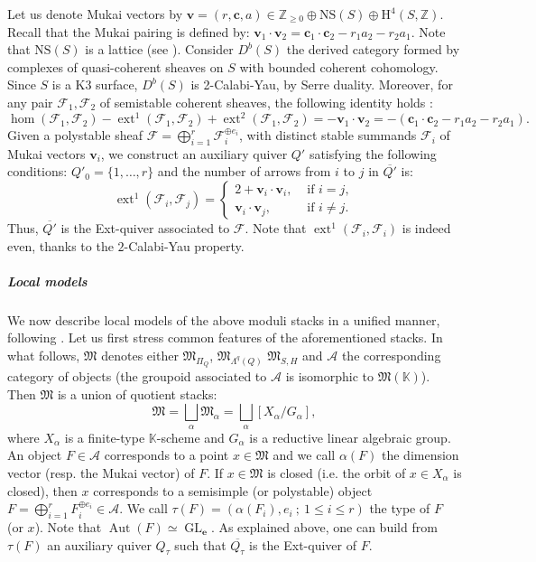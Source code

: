 \documentclass[11pt,english]{article}
\numberwithin{equation}{section}
\numberwithin{figure}{section}
\theoremstyle{definition}
\theoremstyle{plain}
\theoremstyle{remark}
\DeclareMathOperator{\Aut}{Aut}
\DeclareMathOperator{\ext}{ext}
\DeclareMathOperator{\GL}{GL}
\newcommand\ee{\mathbf{e}}
\newcommand\KK{\mathbb{K}}
\begin{document}
Let us denote Mukai vectors by $\textbf{v}=(r,\textbf{c},a)\in\mathbb{Z}_{\geq0}\oplus\mathrm{NS}(S)\oplus\mathrm{H}^{4}(S,\mathbb{Z})$.
Recall that the Mukai pairing is defined by: $\textbf{v}_{1}\cdot\textbf{v}_{2}=\textbf{c}_{1}\cdot\textbf{c}_{2}-r_{1}a_{2}-r_{2}a_{1}$.
Note that $\mathrm{NS}(S)$ is a lattice (see \cite[Ch. 1.]{Huy16}).
Consider $D^{b}(S)$ the derived category formed by complexes of quasi-coherent
sheaves on $S$ with bounded coherent cohomology. Since $S$ is a
K3 surface, $D^{b}(S)$ is 2-Calabi-Yau, by Serre duality. Moreover,
for any pair $\mathcal{F}_{1},\mathcal{F}_{2}$ of semistable coherent
sheaves, the following identity holds \cite[Cor. 6.1.5.]{HL10}:\[
\hom(\mathcal{F}_{1},\mathcal{F}_{2})-\ext^1(\mathcal{F}_{1},\mathcal{F}_{2})+\ext^2(\mathcal{F}_{1},\mathcal{F}_{2})=-\textbf{v}_{1}\cdot\textbf{v}_{2}=-(\textbf{c}_{1}\cdot\textbf{c}_{2}-r_{1}a_{2}-r_{2}a_{1}).
\]Given a polystable sheaf $\mathcal{F}=\bigoplus_{i=1}^{r}\mathcal{F}_{i}^{\oplus e_{i}}$,
with distinct stable summands $\mathcal{F}_{i}$ of Mukai vectors
$\textbf{v}_{i}$, we construct an auxiliary quiver $Q'$ satisfying
the following conditions: $Q'_{0}=\{1,\ldots,r\}$ and the number
of arrows from $i$ to $j$ in $\overline{Q'}$ is:\[
\ext^{1}(\mathcal{F}_{i},\mathcal{F}_{j})
=
\left\{
\begin{array}{ll}
2+\textbf{v}_{i}\cdot\textbf{v}_{i}, & \text{ if } i=j, \\
\textbf{v}_{i}\cdot\textbf{v}_{j}, & \text{ if } i\ne j.
\end{array}
\right.
\]Thus, $\overline{Q'}$ is the Ext-quiver associated to $\mathcal{F}$.
Note that $\ext^{1}(\mathcal{F}_{i},\mathcal{F}_{i})$ is indeed even,
thanks to the $2$-Calabi-Yau property.

\subparagraph*{Local models}

We now describe local models of the above moduli stacks in a unified
manner, following \cite{Dav21a}. Let us first stress common features
of the aforementioned stacks. In what follows, $\mathfrak{M}$ denotes
either $\mathfrak{M}_{\Pi_{Q}}$, $\mathfrak{M}_{\Lambda^{q}(Q)}$
$\mathfrak{M}_{S,H}$ and $\mathcal{A}$ the corresponding category
of objects (the groupoid associated to $\mathcal{A}$ is isomorphic
to $\mathfrak{M}(\KK)$). Then $\mathfrak{M}$ is a union of quotient
stacks:\[
\mathfrak{M}=\bigsqcup_{\alpha}\mathfrak{M}_{\alpha}=\bigsqcup_{\alpha}[X_{\alpha}/G_{\alpha}],
\]where $X_{\alpha}$ is a finite-type $\KK$-scheme and $G_{\alpha}$
is a reductive linear algebraic group. An object $F\in\mathcal{A}$
corresponds to a point $x\in\mathfrak{M}$ and we call $\alpha(F)$
the dimension vector (resp. the Mukai vector) of $F$. If $x\in\mathfrak{M}$
is closed (i.e. the orbit of $x\in X_{\alpha}$ is closed), then $x$
corresponds to a semisimple (or polystable) object $F=\bigoplus_{i=1}^{r}F_{i}^{\oplus e_{i}}\in\mathcal{A}$.
We call $\tau(F)=(\alpha(F_{i}),e_{i}\ ;\ 1\leq i\leq r)$ the type
of $F$ (or $x$). Note that $\Aut(F)\simeq\GL_{\ee}$. As explained
above, one can build from $\tau(F)$ an auxiliary quiver $Q_{\tau}$
such that $\overline{Q_{\tau}}$ is the Ext-quiver of $F$.
\end{document}
